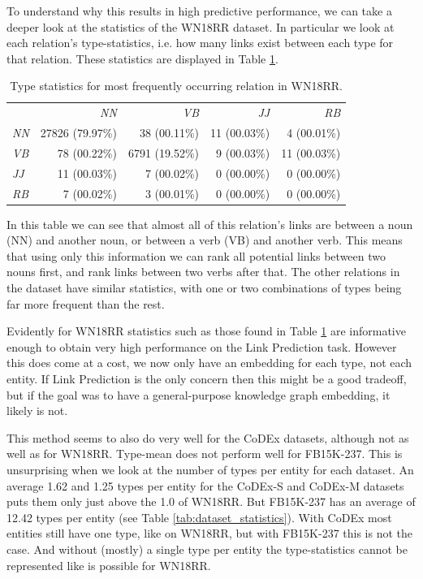 To understand why this results in high predictive performance, we can take a deeper look at the statistics of the WN18RR dataset. In particular we look at each relation's type-statistics, i.e. how many links exist between each type for that relation. These statistics are displayed in Table \ref{tab:wn18rr-relation1-type-statistics}.
%
\begin{table}
    \centering
    \begin{tabular}{lrrrr}
        \toprule
                    & \textit{NN} & \textit{VB} & \textit{JJ} & \textit{RB}  \\
        \cmidrule{1-5}
        \textit{NN} & 27826 (79.97\%) & 38 (00.11\%)   & 11 (00.03\%) & 4 (00.01\%)  \\ %
        \textit{VB} & 78 (00.22\%)    & 6791 (19.52\%) & 9 (00.03\%)  & 11 (00.03\%) \\ %
        \textit{JJ} & 11 (00.03\%)    & 7 (00.02\%)    & 0 (00.00\%)  & 0 (00.00\%)  \\ %
        \textit{RB} & 7 (00.02\%)     & 3 (00.01\%)    & 0 (00.00\%)  & 0 (00.00\%)  \\ %
        \bottomrule
    \end{tabular}
    \label{tab:wn18rr-relation1-type-statistics}
    \caption{Type statistics for most frequently occurring relation in WN18RR.}
\end{table}
%
In this table we can see that almost all of this relation's links are between a noun (NN) and another noun, or between a verb (VB) and another verb. This means that using only this information we can rank all potential links between two nouns first, and rank links between two verbs after that.
The other relations in the dataset have similar statistics, with one or two combinations of types being far more frequent than the rest. 

Evidently for WN18RR statistics such as those found in Table \ref{tab:wn18rr-relation1-type-statistics} are informative enough to obtain very high performance on the Link Prediction task. However this does come at a cost, we now only have an embedding for each type, not each entity. If Link Prediction is the only concern then this might be a good tradeoff, but if the goal was to have a general-purpose knowledge graph embedding, it likely is not.

This method seems to also do very well for the CoDEx datasets, although not as well as for WN18RR. Type-mean does not perform well for FB15K-237. This is unsurprising when we look at the number of types per entity for each dataset. An average 1.62 and 1.25 types per entity for the CoDEx-S and CoDEx-M datasets puts them only just above the 1.0 of WN18RR. But FB15K-237 has an average of 12.42 types per entity (see Table \ref{tab:dataset_statistics}). With CoDEx most entities still have one type, like on WN18RR, but with FB15K-237 this is not the case. And without (mostly) a single type per entity the type-statistics cannot be represented like is possible for WN18RR.

